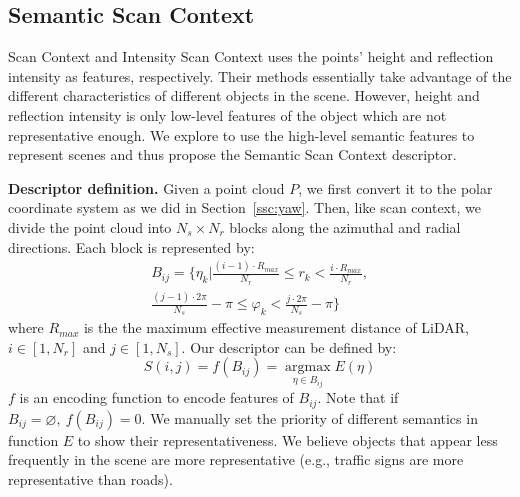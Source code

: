 \documentclass[letterpaper, 10 pt, conference]{ieeeconf}
\begin{document}
\subsection{Semantic Scan Context}
Scan Context and Intensity Scan Context uses the points' height and reflection intensity as features, respectively. Their methods essentially take advantage of the different characteristics of different objects in the scene. However, height and reflection intensity is only low-level features of the object which are not representative enough. We explore to use the high-level semantic features to represent scenes and thus propose the Semantic Scan Context descriptor.

\smallskip\noindent\textbf{Descriptor definition.} Given a point cloud \(P\), we first convert it to the polar coordinate system as we did in Section~\ref{ssc:yaw}. Then, like scan context, we divide the point cloud into \(N_s\times N_r\) blocks along the azimuthal and radial directions. Each block is represented by:
\begin{equation}
    \begin{aligned}
        B_{ij}=\{\eta_k|\frac{(i-1)\cdot R_{max}}{N_r}\leq r_k< \frac{i\cdot R_{max}}{N_r},\\
        \frac{(j-1)\cdot 2\pi }{N_s}-\pi \leq \varphi_k<\frac{j\cdot 2\pi }{N_s}-\pi\}
    \end{aligned}
\end{equation}
where \(R_{max}\) is the the maximum effective measurement distance of LiDAR, \(i\in [1,N_r]\) and \(j\in [1,N_s]\). Our descriptor can be defined by:
\begin{equation}
    S(i,j)=f(B_{ij})=\mathop{argmax}\limits_{\eta \in B_{ij}} E(\eta )\label{eq:descriptor}
\end{equation}
\(f\) is an encoding function to encode features of \(B_{ij}\). Note that if \(B_{ij}=\varnothing ,~f(B_{ij})=0\). We manually set the priority of different semantics in function \(E \) to show their representativeness. We believe objects that appear less frequently in the scene are more representative (e.g., traffic signs are more representative than roads). 
\end{document}
